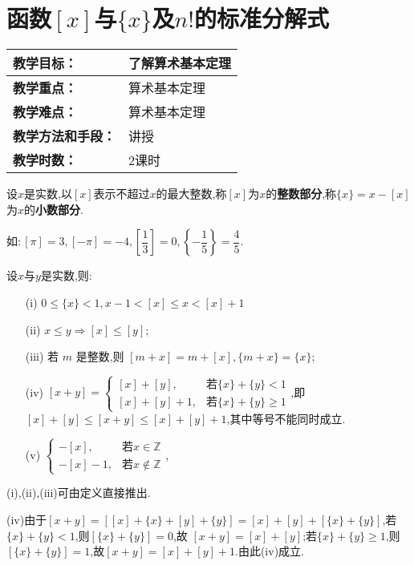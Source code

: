 \section{函数$[x]$与$\{x\}$及$n !$的标准分解式}
\begin{table}[htb]
	\centering  
	\begin{tabular}{p{32mm}|p{95.6mm}}
		\hline 
		\textbf{教学目标：}       & 了解算术基本定理  \\ \hline
		\textbf{教学重点：}       & 算术基本定理 \\ \hline
		\textbf{教学难点：}       & 算术基本定理\\ \hline
		\textbf{教学方法和手段：} & 讲授  \\ \hline
		\textbf{教学时数：}       & 2课时 \\ \hline
	\end{tabular}
\end{table}
 设$x$是实数,以$[x]$表示不超过$x$的最大整数,称$[x]$为$x$的\textbf{整数部分},称$\{x\}=x-[x]$为$x$的\textbf{小数部分}.

\entry 如$:[\pi]=3,[-\pi]=-4,\left[\dfrac{1}{3}\right]=0,\left\{-\dfrac{1}{5}\right\}=\dfrac{4}{5}$.

\theorem 设$x$与$y$是实数,则:
\begin{enumerate}[itemindent=2em]
	\item[(i)] $0 \leqslant\{x\}<1, x-1<[x] \leqslant x<[x]+1$
	\item[(ii)] $x \leqslant y \Rightarrow[x] \leqslant[y]$;
	\item[(iii)] 若 $m$ 是整数,则 $[m+x]=m+[x],\{m+x\}=\{x\}$;
	\item[(iv)] $[x+y]=\begin{cases}{[x]+[y],} & \text{若}\{x\}+\{y\}<1 \\ {[x]+[y]+1,} & \text{若}\{x\}+\{y\} \geqslant 1\end{cases}$,即$[x]+[y] \leqslant[x+y] \leqslant[x]+[y]+1$,其中等号不能同时成立. 
	\item[(v)]$\begin{cases}-[x], & \text{若} x \in \mathbb{Z} \\ -[x]-1, & \text{若} x \notin \mathbb{Z}\end{cases}$,
\end{enumerate}

\proof (i),(ii),(iii)可由定义直接推出.

(iv)由于$[x+y]=[[x]+\{x\}+[y]+\{y\}]=[x]+[y]+[\{x\}+\{y\}]$,若$\{x\}+\{y\}<1$,则$[\{x\}+\{y\}]=0$,故 $[x+y]=[x]+[y]$;若$\{x\}+\{y\} \geqslant 1$,则$[\{x\}+\{y\}]=1$,故$[x+y]=[x]+[y]+1$.由此(iv)成立.

